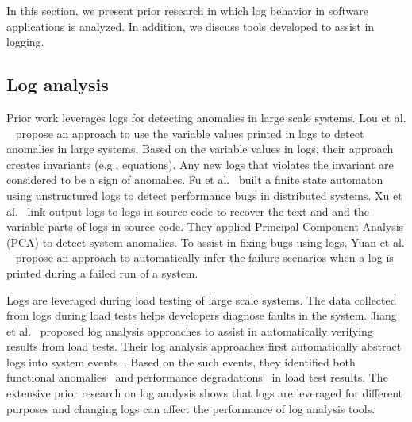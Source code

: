 
In this section, we present prior research in which log behavior in software applications is analyzed. In addition, we discuss tools developed to assist in logging. 

\subsection{Log analysis}

Prior work leverages logs for detecting anomalies in large scale systems. Lou {et al}$.$~\cite{JGLouMining} propose an approach to use the variable values printed in logs to detect anomalies in large systems. Based on the variable values in logs, their approach creates invariants (e.g., equations). Any new logs that violates the invariant are considered to be a sign of anomalies. Fu {et al}$ . $~\cite{QFuanomaly} built a finite state automaton using unstructured logs to detect performance bugs in distributed systems.  \indent Xu {et al}$.$~\cite{ConsoleLogs} link output logs to logs in source code to recover the text and and the variable parts of logs in source code. They applied Principal Component Analysis (PCA) to detect system anomalies. To assist in fixing bugs using logs, Yuan {et al$.$}~\cite{Yuan:2010:SED:1736020.1736038} propose an approach to automatically infer the failure scenarios when a log is printed during a failed run of a system.
%
%

Logs are leveraged during load testing of large scale systems. The data collected from logs during load tests helps developers diagnose faults in the system. Jiang {et al$ . $}~\cite{Jiang:2008:AAA:1400155.1400158,JiangICSM2008,JiangICSM20092,Jiang:2010:ICS:1850000.1850068} proposed log analysis approaches to assist in automatically verifying results from load tests. Their log analysis approaches first automatically abstract logs into system events~\cite{Jiang:2008:AAA:1400155.1400158}. Based on the such events, they identified both functional anomalies~\cite{JiangICSM2008} and performance degradations~\cite{JiangICSM20092} in load test results. The extensive prior research on log analysis shows that logs are leveraged for different purposes and changing logs can affect the performance of log analysis tools. 



